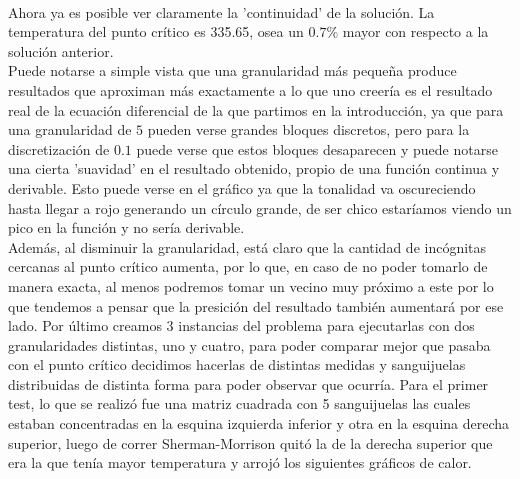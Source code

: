 \\
Ahora ya es posible ver claramente la 'continuidad' de la solución. La temperatura del punto crítico es 335.65, osea un $0.7 \%$ mayor con respecto a la solución anterior.
\\
Puede notarse a simple vista que una granularidad más pequeña produce resultados que aproximan más exactamente a lo que uno creería es el resultado real de la ecuación diferencial de la que partimos en la introducción, ya que para una granularidad de $5$ pueden verse grandes bloques discretos, pero para la discretización de $0.1$ puede verse que estos bloques desaparecen y puede notarse una cierta 'suavidad' en el resultado obtenido, propio de una función continua y derivable. Esto puede verse en el gráfico ya que la tonalidad va oscureciendo hasta llegar a rojo generando un círculo grande, de ser chico estaríamos viendo un pico en la función y no sería derivable.
\\
Además, al disminuir la granularidad, está claro que la cantidad de incógnitas cercanas al punto crítico aumenta, por lo que, en caso de no poder tomarlo de manera exacta, al menos podremos tomar un vecino muy próximo a este por lo que tendemos a pensar que la presición del resultado también aumentará por ese lado.
Por último creamos 3 instancias del problema para ejecutarlas con dos granularidades distintas, uno y cuatro, para poder comparar mejor que pasaba con el punto crítico decidimos hacerlas de distintas medidas y sanguijuelas distribuidas de distinta forma para poder observar que ocurría.
Para el primer test, lo que se realizó fue una matriz cuadrada con 5 sanguijuelas las cuales estaban concentradas en la esquina izquierda inferior y otra en la esquina derecha superior, luego de correr Sherman-Morrison quitó la de la derecha superior que era la que tenía mayor temperatura y arrojó los siguientes gráficos de calor.

